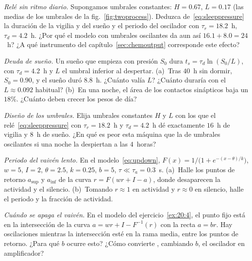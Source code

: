 \begin{exercise}[\lvlA]
\label{ex:20:1}
\emph{Relé sin ritmo diario.} Supongamos umbrales constantes: $H=0.67$, $L=0.17$ (las medias de los umbrales de la fig.~\ref{fig:twoprocess}). Deduzca de~\eqref{eq:sleeppressure} la duración de la vigilia y del sueño y el periodo del oscilador con $\tau_r=18.2$~h, $\tau_d=4.2$~h. ¿Por qué el modelo con umbrales oscilantes da aun así $16.1+8.0=24$~h? ¿A qué instrumento del capítulo~\ref{sec:chemoutput} corresponde este efecto?
\end{exercise}

\begin{exercise}[\lvlA]
\label{ex:20:2}
\emph{Deuda de sueño.} Un sueño que empieza con presión $S_0$ dura $t_s=\tau_d\ln(S_0/L)$, con $\tau_d=4.2$~h y $L$ el umbral inferior al despertar. (a)~Tras $40$~h sin dormir, $S_0=0.90$, y el sueño duró $8.8$~h. ¿Cuánto valía $L$? ¿Cuánto duraría con el $L\approx0.092$ habitual? (b)~En una noche, el área de los contactos sinápticos baja un $18\%$. ¿Cuánto deben crecer los pesos de día?
\end{exercise}

\begin{exercise}[\lvlB]
\label{ex:20:3}
\emph{Diseño de los umbrales.} Elija umbrales constantes $H$ y $L$ con los que el relé~\eqref{eq:sleeppressure} con $\tau_r=18.2$~h y $\tau_d=4.2$~h dé exactamente $16$~h de vigilia y $8$~h de sueño. ¿En qué es peor esta máquina que la de umbrales oscilantes si una noche la despiertan a las $4$~horas?
\end{exercise}

\begin{exercise}[\lvlB]
\label{ex:20:4}
\emph{Periodo del vaivén lento.} En el modelo~\eqref{eq:updown}, $F(x)=1/\bigl(1+e^{-(x-\theta)/k}\bigr)$, $w=5$, $I=2$, $\theta=2.5$, $k=0.25$, $b=5$, $\tau\ll\tau_a=0.3$~s. (a)~Halle los puntos de retorno $a_{\text{sup}}$ y $a_{\text{inf}}$ de la curva $r=F(wr+I-a)$, donde desaparecen la actividad y el silencio. (b)~Tomando $r\approx1$ en actividad y $r\approx0$ en silencio, halle el periodo y la fracción de actividad.
\end{exercise}

\begin{exercise}[\lvlB]
\label{ex:20:5}
\emph{Cuándo se apaga el vaivén.} En el modelo del ejercicio~\ref{ex:20:4}, el punto fijo está en la intersección de la curva $a=wr+I-F^{-1}(r)$ con la recta $a=br$. Hay oscilaciones mientras la intersección esté en la rama media, entre los puntos de retorno. ¿Para qué $b$ ocurre esto? ¿Cómo convierte , cambiando $b$, el oscilador en amplificador?
\end{exercise}

